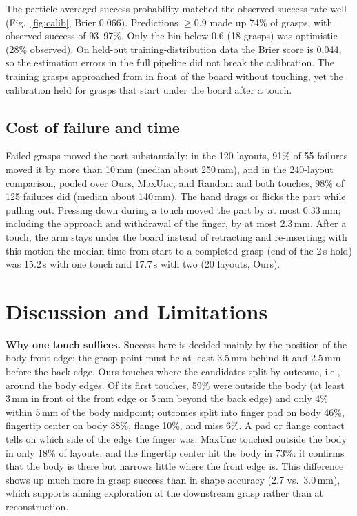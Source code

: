 \documentclass[conference]{IEEEtran}
\newcommand{\Ours}{Ours}
\newcommand{\Unc}{MaxUnc}
\newcommand{\Rand}{Random}
\begin{document}
The particle-averaged success probability matched the observed success rate well (Fig.~\ref{fig:calib}, Brier 0.066). Predictions $\ge0.9$ made up 74\% of grasps, with observed success of 93--97\%. Only the bin below 0.6 (18 grasps) was optimistic (28\% observed). On held-out training-distribution data the Brier score is 0.044, so the estimation errors in the full pipeline did not break the calibration. The training grasps approached from in front of the board without touching, yet the calibration held for grasps that start under the board after a touch.

\subsection{Cost of failure and time}\label{sec:cost}
Failed grasps moved the part substantially: in the 120 layouts, 91\% of 55 failures moved it by more than 10\,mm (median about 250\,mm), and in the 240-layout comparison, pooled over \Ours, \Unc, and \Rand{} and both touches, 98\% of 125 failures did (median about 140\,mm). The hand drags or flicks the part while pulling out. Pressing down during a touch moved the part by at most 0.33\,mm; including the approach and withdrawal of the finger, by at most 2.3\,mm. After a touch, the arm stays under the board instead of retracting and re-inserting; with this motion the median time from start to a completed grasp (end of the 2\,s hold) was 15.2\,s with one touch and 17.7\,s with two (20 layouts, \Ours).

\section{Discussion and Limitations}\label{sec:disc}

\textbf{Why one touch suffices.} Success here is decided mainly by the position of the body front edge: the grasp point must be at least 3.5\,mm behind it and 2.5\,mm before the back edge. \Ours{} touches where the candidates split by outcome, i.e., around the body edges. Of its first touches, 59\% were outside the body (at least 3\,mm in front of the front edge or 5\,mm beyond the back edge) and only 4\% within 5\,mm of the body midpoint; outcomes split into finger pad on body 46\%, fingertip center on body 38\%, flange 10\%, and miss 6\%. A pad or flange contact tells on which side of the edge the finger was. \Unc{} touched outside the body in only 18\% of layouts, and the fingertip center hit the body in 73\%: it confirms that the body is there but narrows little where the front edge is. This difference shows up much more in grasp success than in shape accuracy (2.7 vs.\ 3.0\,mm), which supports aiming exploration at the downstream grasp rather than at reconstruction.
\end{document}
